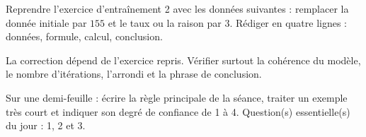 
\begin{homework}Reprendre l'exercice d'entraînement 2 avec les données suivantes : remplacer la donnée initiale par $155$ et le taux ou la raison par $3$. Rédiger en quatre lignes : données, formule, calcul, conclusion.\end{homework}
\begin{solution}La correction dépend de l'exercice repris. Vérifier surtout la cohérence du modèle, le nombre d'itérations, l'arrondi et la phrase de conclusion.\end{solution}

\begin{exitticket}[3 minutes]Sur une demi-feuille : écrire la règle principale de la séance, traiter un exemple très court et indiquer son degré de confiance de 1 à 4. Question(s) essentielle(s) du jour : 1, 2 et 3.\end{exitticket}

